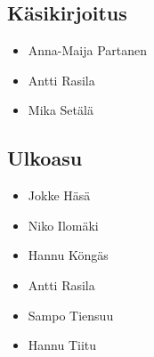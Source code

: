 \subsection*{Käsikirjoitus}
\begin{itemize}
\item Anna-Maija Partanen
\item Antti Rasila
\item Mika Setälä
\end{itemize}

\subsection*{Ulkoasu}
\begin{itemize}
\item Jokke Häsä
\item Niko Ilomäki
\item Hannu Köngäs
\item Antti Rasila
\item Sampo Tiensuu
\item Hannu Tiitu
\end{itemize}

